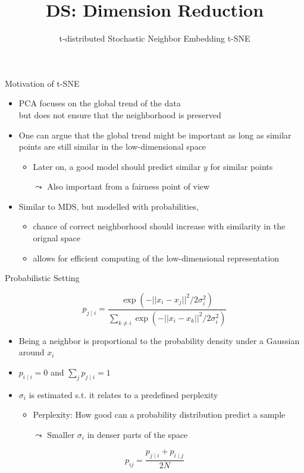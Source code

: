 \documentclass[aspectratio=169]{../latex_main/tntbeamer}  %
\title[t-SNE]{DS: Dimension Reduction}
\subtitle{t-distributed Stochastic Neighbor Embedding t-SNE}
\begin{document}
	
	\maketitle
	\begin{frame}[c]{Motivation of t-SNE}
	    
	    \begin{itemize}
	        \item PCA focuses on the global trend of the data\\
	        but does not ensure that the neighborhood is preserved
	        \pause
	        \item One can argue that the global trend might be important as long as similar points are still similar in the low-dimensional space
	        \begin{itemize}
	            \item Later on, a good model should predict similar $y$ for similar points
	            \item[$\leadsto$] Also important from a fairness point of view
	        \end{itemize}
	        \pause
	        \item Similar to MDS, but modelled with probabilities,
	        \begin{itemize}
	            \item chance of correct neighborhood should increase with similarity in the orignal space
	            \item allows for efficient computing of the low-dimensional representation
	        \end{itemize}
	    \end{itemize}
	    
	\end{frame}
	
	\begin{frame}[c]{Probabilistic Setting}
	    
	    $$ p_{j\mid i } = \frac{\exp(- || x_i - x_j||^2 / 2\sigma_i^2)}{\sum_{k\neq i}  \exp(- || x_i - x_k||^2 / 2\sigma_i^2) } $$
	    
	    \begin{itemize}
	        \item Being a neighbor is proportional to the probability density under a Gaussian around $x_i$
	        \item $p_{i\mid i} = 0$ and $\sum_j p_{j\mid i} = 1$
	        \item $\sigma_i$ is estimated s.t. it relates to a predefined perplexity
	        \begin{itemize}
	            \item Perplexity: How good can a probability distribution predict a sample
	            \item[$\leadsto$] Smaller $\sigma_i$ in denser parts of the space
	        \end{itemize}
	    \end{itemize}
	    
	    \pause
	    
	    $$ p_{ij} = \frac{p_{j\mid i} + p_{i\mid j}}{2N}$$
	    
	\end{frame}
	
\end{document}
